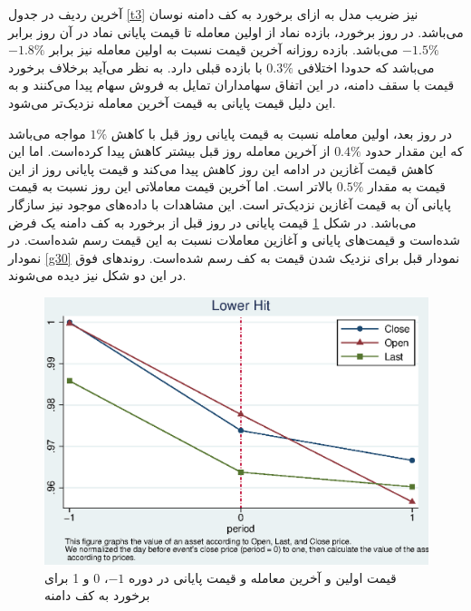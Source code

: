 \documentclass[12pt]{article}
\begin{document}
    
    
    \FloatBarrier
    
     آخرین ردیف در جدول 
     \ref{t3}
     نیز ضریب مدل به ازای برخورد به کف دامنه نوسان می‌باشد. 
     در روز برخورد، بازده نماد از اولین معامله تا قیمت پایانی نماد در آن روز برابر
      $ -1.5\% $
      می‌باشد.
      بازده روزانه آخرین قیمت نسبت به اولین معامله نیز برابر 
       $ -1.8\% $
       می‌باشد که حدودا اختلافی
       $ 0.3\% $
       با بازده قبلی دارد. به نظر می‌آید برخلاف برخورد قیمت با سقف دامنه، در این اتفاق سهامداران تمایل به فروش سهام پیدا می‌کنند و به این دلیل قیمت پایانی به قیمت آخرین معامله نزدیک‌تر می‌شود.
     
     در روز بعد، اولین معامله نسبت به قیمت پایانی روز قبل با کاهش 
     $ 1\% $
     مواجه می‌باشد که این مقدار حدود 
     $ 0.4\% $
     از آخرین معامله روز قبل بیشتر کاهش پیدا کرده‌است. 
     اما این کاهش قیمت آغازین در ادامه این روز کاهش پیدا می‌کند و قیمت پایانی روز از این قیمت به مقدار 
     $0.5\% $
     بالا‌تر است. اما آخرین قیمت معاملاتی این روز نسبت به قیمت پایانی آن به قیمت آغازین نزدیک‌تر است.
     این مشاهدات با داده‌های موجود نیز سازگار می‌باشد. در شکل 
     \ref{g11}
     قیمت پایانی در روز قبل از برخورد به کف دامنه یک فرض شده‌است و قیمت‌های پایانی و آغازین معاملات نسبت به این قیمت رسم شده‌است.
      در نمودار 
     \ref{g30}
     نمودار قبل برای نزدیک شدن قیمت به کف رسم شده‌است. روند‌های فوق در این دو  شکل نیز دیده می‌شوند.
    
    
    
     
      \begin{figure}[htbp]
      \centering
      \includegraphics[width=0.8\columnwidth]{DLT.eps}
     \caption{ قیمت اولین  و آخرین معامله و قیمت پایانی در دوره 
     $ -1 $،
     0 
     و 
     1 
     برای برخورد به کف دامنه}
      \label{g11}
      \end{figure}
    
\end{document}
